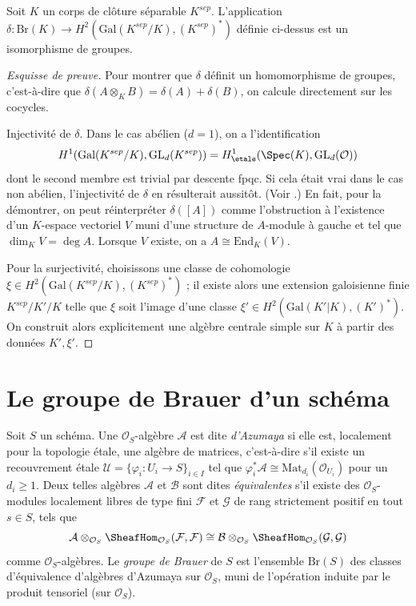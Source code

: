 \begin{theorem}
\label{theorem-brauer-delta}
Soit $K$ un corps de cl\^oture s\'eparable $K^{sep}$. L'application
$\delta : \text{Br}(K) \to H^2(\text{Gal}(K^{sep}/K), (K^{sep})^*)$
d\'efinie ci-dessus est un isomorphisme de groupes.
\end{theorem}

\begin{proof}[Esquisse de preuve]
Pour montrer que $\delta$ d\'efinit un homomorphisme de groupes, c'est-\`a-dire que
$\delta(A \otimes_K B) = \delta(A) + \delta(B)$, on calcule
directement sur les cocycles.

\medskip\noindent
Injectivit\'e de $\delta$. Dans le cas ab\'elien ($d = 1$), on a
l'identification
$$
H^1(\text{Gal}(K^{sep}/K), \text{GL}_d(K^{sep})) =
H_\etale^1(\Spec(K), \text{GL}_d(\mathcal{O}))
$$
dont le second membre est trivial par descente fpqc. Si cela \'etait vrai dans le
cas non ab\'elien, l'injectivit\'e de $\delta$ en r\'esulterait aussit\^ot. (Voir
\cite{SGA4.5}.) En fait, pour la d\'emontrer, on peut r\'einterpr\'eter $\delta([A])$ comme
l'obstruction \`a l'existence d'un $K$-espace vectoriel $V$ muni d'une structure de $A$-module
\`a gauche et tel que $\dim_K V = \deg A$. Lorsque $V$ existe, on
a $A \cong \text{End}_K(V)$.

\medskip\noindent
Pour la surjectivit\'e, choisissons une
classe de cohomologie $\xi \in H^2(\text{Gal}(K^{sep}/K), (K^{sep})^*)$ ;
il existe alors une extension galoisienne finie $K^{sep}/K'/K$
telle que $\xi$ soit l'image d'une classe
$\xi' \in H^2(\text{Gal}(K'|K), (K')^*)$. On construit alors
explicitement une alg\`ebre centrale simple sur $K$ \`a partir des donn\'ees $K', \xi'$.
\end{proof}










\section{Le groupe de Brauer d'un sch\'ema}
\label{section-brauer-scheme}

\noindent
Soit $S$ un sch\'ema. Une $\mathcal{O}_S$-alg\`ebre
$\mathcal{A}$ est dite {\it d'Azumaya} si elle est, localement pour la topologie \'etale, une alg\`ebre
de matrices, c'est-\`a-dire s'il existe un recouvrement \'etale
$\mathcal{U} = \{ \varphi_i : U_i \to S\}_{i \in I}$ tel que
$\varphi_i^*\mathcal{A} \cong \text{Mat}_{d_i}(\mathcal{O}_{U_i})$
pour un $d_i \geq 1$. Deux telles alg\`ebres
$\mathcal{A}$ et $\mathcal{B}$ sont dites {\it \'equivalentes} s'il existe
des $\mathcal{O}_S$-modules localement libres de type fini $\mathcal{F}$ et $\mathcal{G}$
de rang strictement positif en tout $s \in S$, tels que
$$
\mathcal{A} \otimes_{\mathcal{O}_S}
\SheafHom_{\mathcal{O}_S}(\mathcal{F}, \mathcal{F})
\cong
\mathcal{B} \otimes_{\mathcal{O}_S}
\SheafHom_{\mathcal{O}_S}(\mathcal{G}, \mathcal{G})
$$
comme $\mathcal{O}_S$-alg\`ebres. Le {\it groupe de Brauer} de
$S$ est l'ensemble $\text{Br}(S)$ des classes d'\'equivalence d'alg\`ebres
d'Azumaya sur $\mathcal{O}_S$, muni de l'op\'eration induite par le produit tensoriel (sur
$\mathcal{O}_S$).

